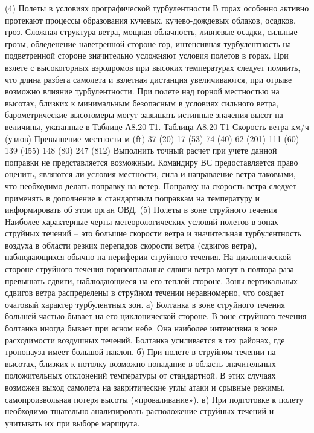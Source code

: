 (4) Полеты в условиях орографической турбулентности
В горах особенно активно протекают процессы образования кучевых, кучево-дождевых облаков, осадков, гроз.
Сложная структура ветра, мощная облачность, ливневые осадки, сильные грозы, обледенение наветренной стороне гор, интенсивная турбулентность на подветренной стороне значительно усложняют условия полетов в горах.
При взлете с высокогорных аэродромов при высоких температурах следует помнить, что длина разбега самолета и взлетная дистанция увеличиваются, при отрыве возможно влияние турбулентности. При полете над горной местностью на высотах, близких к минимальным безопасным в условиях сильного ветра, барометрические высотомеры могут завышать истинные значения высот на величины, указанные в Таблице А8.20-Т1.
                                                                         Таблица А8.20-Т1
Скорость ветра км/ч (узлов)	Превышение местности м (ft)
37 (20)	17 (53)
74 (40)	62 (201)
111 (60)	139 (455)
148 (80)	247 (812)
Выполнить точный расчет при учете данной поправки не представляется возможным.
Командиру ВС предоставляется право оценить, являются ли условия местности, сила и направление ветра таковыми, что необходимо делать поправку на ветер. Поправку на скорость ветра следует применять в дополнение к стандартным поправкам на температуру и информировать об этом орган ОВД.
(5) Полеты в зоне струйного течения
Наиболее характерные черты метеорологических условий полетов в зонах струйных течений – это большие скорости ветра и значительная турбулентность воздуха в области резких перепадов скорости ветра (сдвигов ветра), наблюдающихся обычно на периферии струйного течения. На циклонической стороне струйного течения горизонтальные сдвиги ветра могут в полтора раза превышать сдвиги, наблюдающиеся на его теплой стороне. Зоны вертикальных сдвигов ветра распределены в струйном течении неравномерно, что создает очаговый характер турбулентных зон.
а)	Болтанка в зоне струйного течения большей частью бывает на его циклонической стороне. В зоне струйного течения болтанка иногда бывает при ясном небе. Она наиболее интенсивна в зоне расходимости воздушных течений. Болтанка усиливается в тех районах, где тропопауза имеет большой наклон.
б)	При полете в струйном течении на высотах, близких к потолку возможно попадание в область значительных положительных отклонений температуры от стандартной. В этих случаях возможен выход самолета на закритические углы атаки и срывные режимы, самопроизвольная потеря высоты («проваливание»).
в)	При подготовке к полету необходимо тщательно анализировать расположение струйных течений и учитывать их при выборе маршрута.
